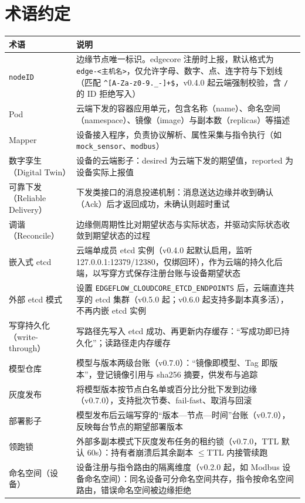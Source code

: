 \section{术语约定}

\begin{tabularx}{\textwidth}{|l|X|}
  \hline
  \textbf{术语} & \textbf{说明} \\
  \hline
  \texttt{nodeID} & 边缘节点唯一标识。edgecore 注册时上报，默认格式为 \texttt{edge-<主机名>}，仅允许字母、数字、点、连字符与下划线（匹配 \texttt{\textasciicircum{}[A-Za-z0-9.\_-]+\$}，v0.4.0 起云端强制校验，含 \texttt{/} 的 ID 拒绝写入） \\
  \hline
  Pod & 云端下发的容器应用单元，包含名称（name）、命名空间（namespace）、镜像（image）与副本数（replicas）等描述 \\
  \hline
  Mapper & 设备接入程序，负责协议解析、属性采集与指令执行（如 \texttt{mock\_sensor}、\texttt{modbus}） \\
  \hline
  数字孪生（Digital Twin） & 设备的云端影子：desired 为云端下发的期望值，reported 为设备实际上报值 \\
  \hline
  可靠下发（Reliable Delivery） & 下发类接口的消息投递机制：消息送达边缘并收到确认（Ack）后才返回成功，未确认则超时重试 \\
  \hline
  调谐（Reconcile） & 边缘侧周期性比对期望状态与实际状态，并驱动实际状态收敛到期望状态的过程 \\
  \hline
  嵌入式 etcd & 云端单成员 etcd 实例（v0.4.0 起默认启用，监听 127.0.0.1:12379/12380，仅绑回环），作为云端的持久化后端，以写穿方式保存注册台账与设备期望状态 \\
  \hline
  外部 etcd 模式 & 设置 \texttt{EDGEFLOW\_CLOUDCORE\_ETCD\_ENDPOINTS} 后，云端直连共享的 etcd 集群（v0.5.0 起；v0.6.0 起支持多副本真多活），不再内嵌 etcd 实例 \\
  \hline
  写穿持久化（write-through） & 写路径先写入 etcd 成功、再更新内存缓存：\textquotedblleft 写成功即已持久化\textquotedblright ；读路径走内存缓存 \\
  \hline
  模型仓库 & 模型与版本两级台账（v0.7.0）：\textquotedblleft 镜像即模型、Tag 即版本\textquotedblright ，登记镜像引用与 sha256 摘要，供发布与追踪 \\
  \hline
  灰度发布 & 将模型版本按节点白名单或百分比分批下发到边缘（v0.7.0），支持批次节奏、fail-fast、取消与回滚 \\
  \hline
  部署影子 & 模型发布后云端写穿的\textquotedblleft 版本—节点—时间\textquotedblright 台账（v0.7.0），反映每台节点的期望部署版本 \\
  \hline
  领跑锁 & 外部多副本模式下灰度发布任务的租约锁（v0.7.0，TTL 默认 60s）：持有者崩溃后其余副本 $\le$TTL 内接管续跑 \\
  \hline
  命名空间（设备） & 设备注册与指令路由的隔离维度（v0.2.0 起，如 Modbus 设备命名空间）：同名设备可分命名空间共存，指令按命名空间路由，错误命名空间被边缘拒绝 \\
  \hline
\end{tabularx}

